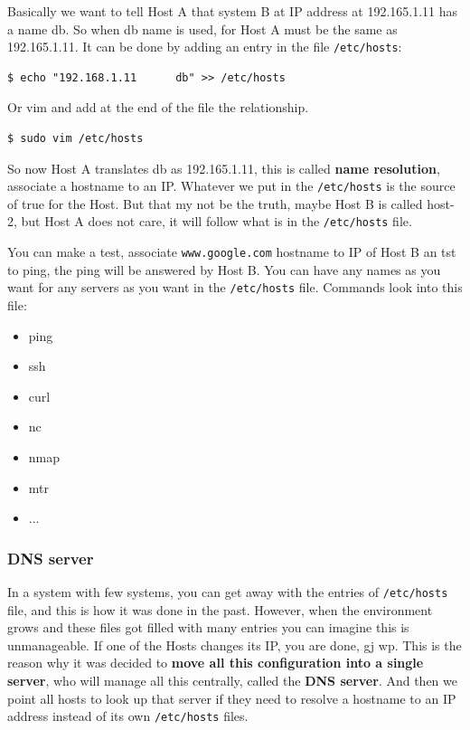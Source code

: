 \documentclass{article}
\newenvironment{codetemplate}[1][]{%
  \mybasecolorbox[#1]
  \itshape
}{%
  \endmybasecolorbox
}
\begin{document}
Basically we want to tell Host A that system B at IP address at 192.165.1.11 has a name db. So when db name is used, for Host A must be the same as 192.165.1.11. It can be done by adding an entry in the file \verb|/etc/hosts|:

\begin{codetemplate}{}
\begin{verbatim}
$ echo "192.168.1.11      db" >> /etc/hosts
\end{verbatim}
\end{codetemplate}

Or vim and add at the end of the file the relationship.
\begin{codetemplate}{}
\begin{verbatim}
$ sudo vim /etc/hosts
\end{verbatim}
\end{codetemplate}

So now Host A translates db as 192.165.1.11, this is called \textbf{name resolution}, associate a hostname to an IP. Whatever we put in the \verb|/etc/hosts| is the source of true for the Host. But that my not be the truth, maybe Host B is called host-2, but Host A does not care, it will follow what is in the \verb|/etc/hosts| file. 

You can make a test, associate \verb|www.google.com| hostname to IP of Host B an tst to ping, the ping will be answered by Host B. You can have any names as you want for any servers as you want in the \verb|/etc/hosts| file. Commands look into this file:

\begin{itemize}
    \item ping
    \item ssh
    \item curl
    \item nc
    \item nmap
    \item mtr
    \item ...
\end{itemize}

\subsubsection{DNS server}

In a system with few systems, you can get away with the entries of \verb|/etc/hosts| file, and this is how it was done in the past. However, when the environment grows and these files got filled with many entries you can imagine this is unmanageable. If one of the Hosts changes its IP, you are done, gj wp. This is the reason why it was decided to \textbf{move all this configuration into a single server}, who will manage all this centrally, called the \textbf{DNS server}. And then we point all hosts to look up that server if they need to resolve a hostname to an IP address instead of its own \verb|/etc/hosts| files.
\end{document}

